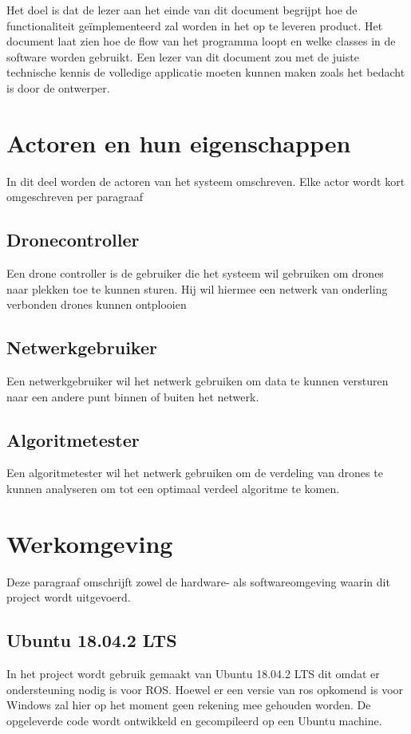 \documentclass[a4paper, 11pt, oneside]{report}
\begin{document}
Het doel is dat de lezer aan het einde van dit document begrijpt hoe de functionaliteit geïmplementeerd zal worden in het op te leveren product. Het document laat zien hoe de flow van het programma loopt en welke classes in de software worden gebruikt. Een lezer van dit document zou met de juiste technische kennis de volledige applicatie moeten kunnen maken zoals het bedacht is door de ontwerper.  

\section{Actoren en hun eigenschappen}
\label{inleiding:gebruikers}
In dit deel worden de actoren van het systeem omschreven. 
Elke actor wordt kort omgeschreven per paragraaf 

\subsection{Dronecontroller}
\label{inleiding:gebruikers:dronecontroller}
Een drone controller is de gebruiker die het systeem wil gebruiken om drones naar plekken toe te kunnen sturen.
Hij wil hiermee een netwerk van onderling verbonden drones kunnen ontplooien  

\subsection{Netwerkgebruiker}
\label{inleiding:gebruikers:netwerkgebruiker}
Een netwerkgebruiker wil het netwerk gebruiken om data te kunnen versturen naar een andere punt binnen of buiten het netwerk. 

\subsection{Algoritmetester}
\label{inleiding:gebruikers:algoritmetester}
Een algoritmetester wil het netwerk gebruiken om de verdeling van drones te kunnen analyseren om tot een optimaal verdeel algoritme te komen.

\section{Werkomgeving}
\label{inleiding:werkomgeving}
Deze paragraaf omschrijft zowel de hardware- als softwareomgeving waarin dit project wordt uitgevoerd. 

\subsection{Ubuntu 18.04.2 LTS}
\label{inleiding:werkomgeving:ubuntu}
In het project wordt gebruik gemaakt van Ubuntu 18.04.2 LTS dit omdat er ondersteuning nodig is voor ROS.
Hoewel er een versie van ros opkomend is voor Windows zal hier op het moment geen rekening mee gehouden worden.
De opgeleverde code wordt ontwikkeld en gecompileerd op een Ubuntu machine.
\end{document}
